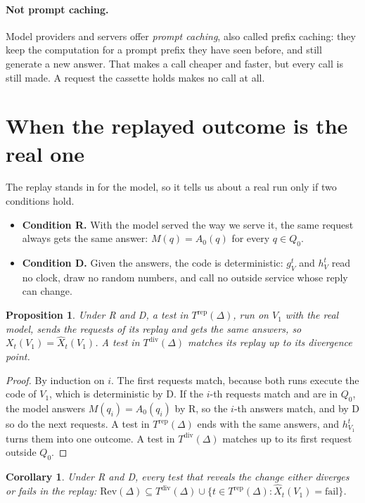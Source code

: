 \documentclass[11pt,a4paper]{article}
\newtheorem{proposition}{Proposition}
\newtheorem{corollary}{Corollary}
\newcommand{\Trep}{T^{\mathrm{rep}}(\Delta)}
\newcommand{\Tdiv}{T^{\mathrm{div}}(\Delta)}
\begin{document}
\paragraph{Not prompt caching.} Model providers and servers offer \emph{prompt caching}, also called prefix
caching: they keep the computation for a prompt prefix they have seen before, and still generate a new answer.
That makes a call cheaper and faster, but every call is still made. A request the cassette holds makes no call at
all.

\section{When the replayed outcome is the real one}
\label{sec:conditions}

The replay stands in for the model, so it tells us about a real run only if two conditions hold.
\begin{itemize}
  \item \textbf{Condition R.} With the model served the way we serve it, the same request always gets the same
        answer: $M(q) = A_0(q)$ for every $q \in Q_0$.
  \item \textbf{Condition D.} Given the answers, the code is deterministic: $g^t_V$ and $h^t_V$ read no clock,
        draw no random numbers, and call no outside service whose reply can change.
\end{itemize}

\begin{proposition}
\label{prop:replay}
Under R and D, a test in $\Trep$, run on $V_1$ with the real model, sends the requests of its replay and gets the
same answers, so $X_t(V_1) = \hat{X}_t(V_1)$. A test in $\Tdiv$ matches its replay up to its divergence point.
\end{proposition}

\begin{proof}
By induction on $i$. The first requests match, because both runs execute the code of $V_1$, which is
deterministic by D. If the $i$-th requests match and are in $Q_0$, the model answers $M(q_i) = A_0(q_i)$ by R, so
the $i$-th answers match, and by D so do the next requests. A test in $\Trep$ ends with the same answers, and
$h^t_{V_1}$ turns them into one outcome. A test in $\Tdiv$ matches up to its first request outside $Q_0$.
\end{proof}

\begin{corollary}
\label{cor:safe}
Under R and D, every test that reveals the change either diverges or fails in the replay:
$\mathrm{Rev}(\Delta) \subseteq \Tdiv \cup \{t \in \Trep : \hat{X}_t(V_1) = \text{fail}\}$.
\end{corollary}
\end{document}
